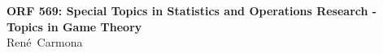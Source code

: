 \documentclass[a4paper,12pt]{article}
\theoremstyle{remark}
\theoremstyle{definition}
\numberwithin{equation}{subsection}
\begin{document}
\begin{center}
\hspace*{0.15 in} {\Large \bf ORF 569:  Special Topics in Statistics and Operations Research - Topics in Game Theory}\\
           Ren\'e\  Carmona

\end{center}

\tableofcontents


\newpage



\newpage
\newpage




\newpage



\newpage



\newpage


\newpage


\newpage


\newpage


\newpage


\newpage


\newpage

{}
\end{document}
